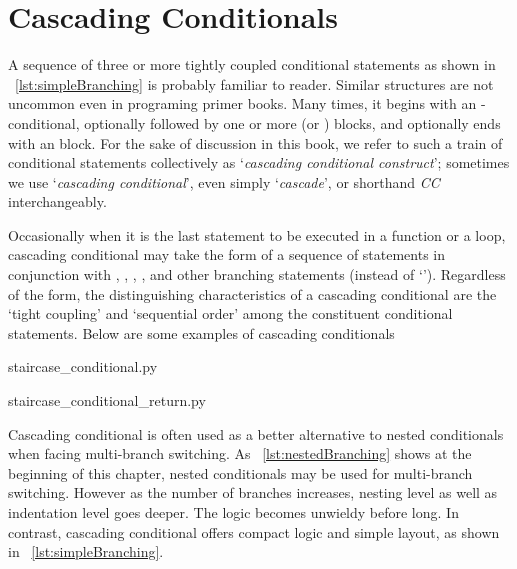 
\chapter{Cascading Conditionals}\label{ch:conditional-cascade}

A sequence of three or more tightly coupled conditional statements as shown in
~\autoref{lst:simpleBranching} is probably familiar to reader.
Similar structures are not uncommon even in programing primer books.
Many times, it begins with an -conditional, optionally followed by one or more
 (or ) blocks, and optionally ends with an  block.
For the sake of discussion in this book, we refer to such a train of conditional statements
collectively as `\emph{cascading conditional construct}';
sometimes we use `\emph{cascading conditional}', even simply `\emph{cascade}',
or shorthand \emph{CC}  interchangeably.

Occasionally when it is the last statement to be executed in a function
or a loop, cascading conditional may take the form of a sequence of  statements
in conjunction with , ,
, ,  and other branching statements (instead
of `').
Regardless of the form, the distinguishing characteristics of a cascading conditional are
the `tight coupling' and `sequential order' among the constituent conditional statements.
Below are some examples of cascading conditionals
\begin{clisting}[h]
    \begin{minipage}[t]{.4\textwidth}
        
        {staircase_conditional.py}
    \end{minipage}\hfill
    \begin{minipage}[t]{.4\textwidth}
        
        {staircase_conditional_return.py}
    \end{minipage}
\end{clisting}



Cascading conditional is often used as a better alternative to nested conditionals
when facing multi-branch switching.
As ~\autoref{lst:nestedBranching} shows at the beginning of this chapter,
nested conditionals may be used for multi-branch switching.
However as the number of branches increases, nesting level as well as indentation level goes deeper.
The logic becomes unwieldy before long.
In contrast, cascading conditional offers compact logic and simple layout,
as shown in ~\autoref{lst:simpleBranching}.


